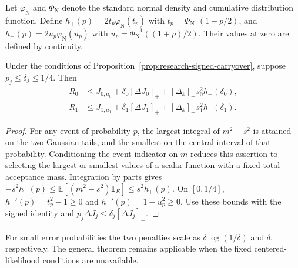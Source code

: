 Let $\varphi_{\mathrm N}$ and $\Phi_{\mathrm N}$ denote the standard normal density and cumulative distribution function.
Define $h_+(p)=2t_p\varphi_{\mathrm N}(t_p)$ with $t_p=\Phi_{\mathrm N}^{-1}(1-p/2)$, and $h_-(p)=2u_p\varphi_{\mathrm N}(u_p)$ with $u_p=\Phi_{\mathrm N}^{-1}((1+p)/2)$.
Their values at zero are defined by continuity.
\begin{proposition}
Under the conditions of Proposition~\ref{prop:research-signed-carryover}, suppose $p_j\le\delta_j\le1/4$.
Then
\begin{align}
R_0&\le J_{0,a_0}+\delta_0[\Delta J_0]_+
+[\Delta_k]_+s_0^2h_+(\delta_0),\\
R_1&\le J_{1,a_1}+\delta_1[\Delta J_1]_+
+[\Delta_k]_+s_1^2h_-(\delta_1).
\end{align}
\label{prop:research-tail-risk}
\end{proposition}
\begin{proof}
For any event of probability $p$, the largest integral of $m^2-s^2$ is attained on the two Gaussian tails, and the smallest on the central interval of that probability.
Conditioning the event indicator on $m$ reduces this assertion to selecting the largest or smallest values of a scalar function with a fixed total acceptance mass.
Integration by parts gives $-s^2h_-(p)\le\mathbb E[(m^2-s^2)\mathbf1_E]\le s^2h_+(p)$.
On $[0,1/4]$, $h_+'(p)=t_p^2-1\ge0$ and $h_-'(p)=1-u_p^2\ge0$.
Use these bounds with the signed identity and $p_j\Delta J_j\le\delta_j[\Delta J_j]_+$.
\end{proof}
For small error probabilities the two penalties scale as $\delta\log(1/\delta)$ and $\delta$, respectively.
The general theorem remains applicable when the fixed centered-likelihood conditions are unavailable.

